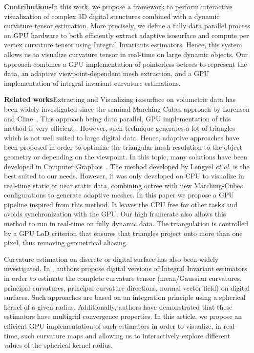 \documentclass{llncs}
\begin{document}
\noindent\textbf{Contributions}\quad In this work, we propose a
framework to perform interactive visualization of complex 3D digital
structures combined with a dynamic curvature tensor estimation. More
precisely, we define a fully data parallel process on GPU hardware  to
both efficiently extract adaptive isosurface and compute per vertex
curvature tensor using Integral Invariants estimators. Hence, this
system allows us to visualize curvature tensor in real-time on large
dynamic objects. Our approach combines a GPU implementation of
pointerless octrees to represent the data, an adaptive
viewpoint-dependent mesh extraction, and a GPU implementation of
integral invariant curvature estimations.


\vspace{0.2cm}

\sloppy\noindent\textbf{Related works}\quad Extracting and Visualizing
isosurface on volumetric data has been widely investigated since the
seminal Marching-Cubes approach by Lorensen and
Cline~\cite{lorensen1987marching}. This approach being data parallel,
GPU implementation of this method is very efficient
\cite{tatarchuk2007real}. However, such technique generates a lot of
triangles which is not well suited to large digital data. Hence,
adaptive approaches have been proposed in order to optimize the
triangular mesh resolution to the object geometry or depending on the
viewpoint. In this topic, many solutions have been developed in
Computer
Graphics~\cite{shu1995adaptive,schaefer2004dual,lengyel2010voxel,DBLP:journals/cgf/LewinerMPPL10,DBLP:journals/cvgip/LobelloDD14}.
The method developed by Lengyel \textit{et al.}
\cite{lengyel2010voxel} is the best suited to our needs.  However, it
was only developed on CPU to visualize in real-time static or near
static data, combining octree with new Marching-Cubes configurations
to generate adaptive meshes. In this paper we propose a GPU pipeline
inspired from this method.  It leaves the CPU free for other tasks and
avoids synchronization with the GPU.  Our high framerate also allows
this method to run in real-time on fully dynamic data.  The
triangulation is controlled by a GPU LoD criterion that ensures that
triangles project onto more than one pixel, thus removing geometrical
aliasing.

Curvature estimation on discrete or digital surface has also been
widely investigated. In \cite{CVIU2014}, authors propose digital
versions of Integral Invariant estimators
\cite{Pottmann2007,Pottmann2009} in order to estimate the complete
curvature tensor (mean/Gaussian curvatures, principal curvatures,
principal curvature directions, normal vector field) on digital
surfaces. Such approaches are based on an integration principle using
a spherical kernel of a given radius. Additionally, authors have
demonstrated that these estimators have multigrid convergence
properties. In this article, we propose an efficient GPU
implementation of such estimators in order to visualize, in real-time,
such curvature maps and allowing us to interactively explore different
values of the spherical kernel radius.
\end{document}
